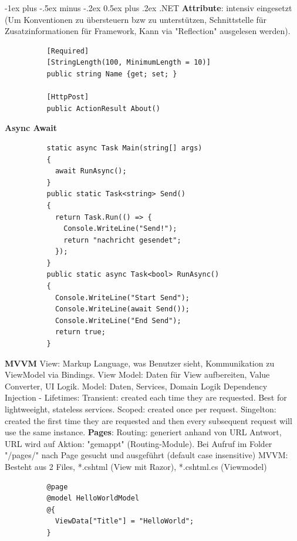 \documentclass[10pt,landscape]{article}
\makeatletter
\renewcommand{\section}{\@startsection{section}{1}{0mm}%
{-1ex plus -.5ex minus -.2ex}%
{0.5ex plus .2ex}%
{\normalfont\large\bfseries}}
\makeatother
\begin{document}
\begin{multicols}{3}
        \section{.NET}
        \textbf{Attribute}: intensiv eingesetzt (Um Konventionen zu übersteuern bzw zu unterstützen, Schnittstelle für Zusatzinformationen für Framework, Kann via "Reflection" ausgelesen werden).
        \begin{lstlisting}
          [Required]
          [StringLength(100, MinimumLength = 10)]
          public string Name {get; set; }

          [HttpPost]
          public ActionResult About()
        \end{lstlisting}

        \textbf{Async Await}
        \begin{lstlisting}
          static async Task Main(string[] args)
          {
            await RunAsync();
          }
          public static Task<string> Send()
          {
            return Task.Run(() => {
              Console.WriteLine("Send!");
              return "nachricht gesendet";
            });
          }
          public static async Task<bool> RunAsync()
          {
            Console.WriteLine("Start Send");
            Console.WriteLine(await Send());
            Console.WriteLine("End Send");
            return true;
          }
        \end{lstlisting}
        \textbf{MVVM} View: Markup Language, was Benutzer sieht, Kommunikation zu ViewModel via Bindings. View Model: Daten für View aufbereiten, Value Converter, UI Logik. Model: Daten, Services, Domain Logik
        Dependency Injection - Lifetimes: Transient: created each time they are requested. Best for lightweeight, stateless services. Scoped: created once per request. Singelton: created the first time they are requested and then every subsequent request will use the same instance.
        \textbf{Pages}:
        Routing: generiert anhand von URL Antwort, URL wird auf Aktion: "gemappt" (Routing-Module). Bei Aufruf im Folder "/pages/" nach Page gesucht und ausgeführt (default case insensitive)
        MVVM: Besteht aus 2 Files, *.cshtml (View mit Razor), *.cshtml.cs (Viewmodel)
        \begin{lstlisting}
          @page
          @model HelloWorldModel
          @{
            ViewData["Title"] = "HelloWorld";
          }


\end{lstlisting}
\end{multicols}
\end{document}
